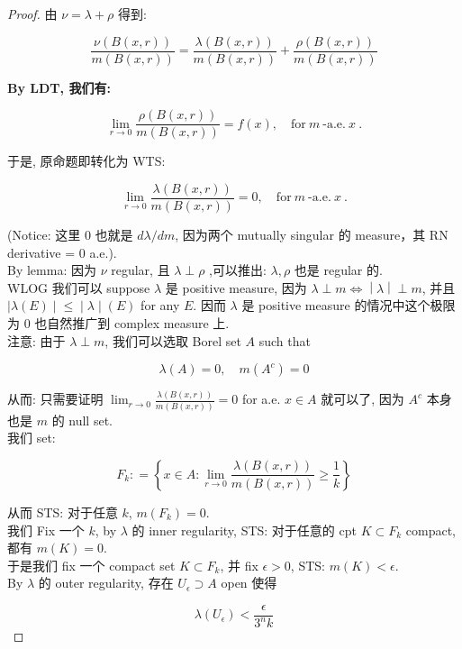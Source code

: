 \documentclass{qlnotes-export}
\begin{document}
\begin{proof}

由 \(\nu = \lambda + \rho\) 得到:

\[\frac{\nu(B(x,r))}{m(B(x,r))} = \frac{\lambda(B(x,r))}{m(B(x,r))} + \frac{\rho(B(x,r))}{m(B(x,r))}\]

\textbf{By LDT, 我们有:}

\[\lim\limits_{r\rightarrow 0}\frac{\rho(B(x,r))}{m(B(x,r))} = f(x),\quad\text{for}\ m\ \text{-a.e.}\ x\ \text{.}\]

于是, 原命题即转化为 WTS:

\[\lim\limits_{r\rightarrow 0}\frac{\lambda(B(x,r))}{m(B(x,r))} = 0,\quad\text{for}\ m\ \text{-a.e.}\ x\ \text{.}\]

(Notice: 这里 \(0\) 也就是 \(d\lambda/dm\), 因为两个 mutually singular 的 measure，其 RN derivative = \(0\) a.e.).\\
By lemma: 因为 \(\nu\) regular, 且 \(\lambda \perp \rho\) ,可以推出: \(\lambda,\rho\) 也是 regular 的.\\
WLOG 我们可以 suppose \(\lambda\) 是 positive measure, 因为 \(\left. \lambda \perp m\Leftrightarrow \middle| \lambda \middle| \perp m \right.\), 并且\(\left. |\lambda(E) \middle| \leq \middle| \lambda \middle| (E) \right.\) for any \(E\). 因而 \(\lambda\) 是 positive measure 的情况中这个极限为 \(0\) 也自然推广到 complex measure 上.\\
注意: 由于 \(\lambda \perp m\), 我们可以选取 Borel set \(A\) such that

\[\lambda(A) = 0,\quad m(A^{c}) = 0\]

从而: 只需要证明 \(\lim_{r\rightarrow 0}\frac{\lambda(B(x,r))}{m(B(x,r))} = 0\) for a.e. \(x \in A\) 就可以了, 因为 \(A^{c}\) 本身也是 \(m\) 的 null set.\\
我们 set:

\[F_{k}: = \left\{ {x \in A:\lim\limits_{r\rightarrow 0}\frac{\lambda(B(x,r))}{m(B(x,r))} \geq \frac{1}{k}} \right\}\]

从而 STS: 对于任意 \(k\), \(m(F_{k}) = 0\).\\
我们 Fix 一个 \(k\), by \(\lambda\) 的 inner regularity, STS: 对于任意的 cpt \(K \subset F_{k}\) compact, 都有 \(m(K) = 0\).\\
于是我们 fix 一个 compact set \(K \subset F_{k}\), 并 fix \(\epsilon > 0\), STS: \(m(K) < \epsilon\).\\
By \(\lambda\) 的 outer regularity, 存在 \(U_{\epsilon} \supset A\) open 使得

\[\lambda(U_{\epsilon}) < \frac{\epsilon}{3^{n}k}\]


\end{proof}
\end{document}
